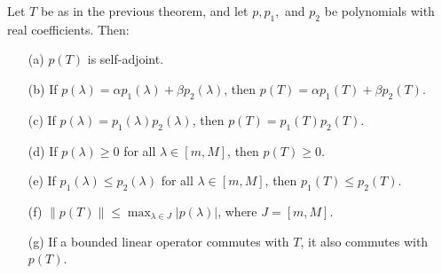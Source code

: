 \begin{theorem}[Properties of \( p(T) \)]
   Let \( T  \) be as in the previous theorem, and let \( p, {p}_{1}, \) and \( {p}_{2} \) be polynomials with real coefficients. Then: 
   \begin{enumerate}
       \item[(a)] \( p(T) \) is self-adjoint.
        \item[(b)] If \( p(\lambda) = \alpha {p}_{1}(\lambda) + \beta {p}_{2}(\lambda) \), then \( p(T) = \alpha {p}_{1}(T) + \beta {p}_{2} (T) \).
        \item[(c)] If \( p(\lambda) = {p}_{1}(\lambda) {p}_{2}(\lambda)  \), then \( p(T) = {p}_{1}(T) {p}_{2}(T) \).
        \item[(d)] If \( p(\lambda) \geq 0  \) for all \( \lambda \in [m,M] \), then \( p(T) \geq 0  \).
        \item[(e)] If \( {p}_{1}(\lambda) \leq {p}_{2}(\lambda)  \) for all \( \lambda \in [m,M ]  \), then \( {p}_{1}(T) \leq {p}_{2}(T) \).
        \item[(f)] \( \|p(T)\| \leq \max_{\lambda \in J } | p(\lambda) |  \), where \( J = [m,M] \).
        \item[(g)] If a bounded linear operator commutes with \( T  \), it also commutes with \( p(T) \).
    \end{enumerate}
\end{theorem}



